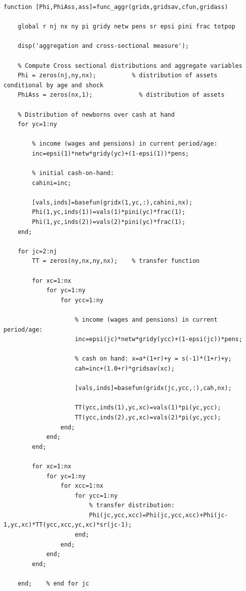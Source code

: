 \documentclass[12pt,a4paper]{article}
\begin{document}
\begin{lstlisting}[frame=single]
    function [Phi,PhiAss,ass]=func_aggr(gridx,gridsav,cfun,gridass)

    global r nj nx ny pi gridy netw pens sr epsi pini frac totpop

    disp('aggregation and cross-sectional measure');

    % Compute Cross sectional distributions and aggregate variables
    Phi = zeros(nj,ny,nx);          % distribution of assets conditional by age and shock
    PhiAss = zeros(nx,1);             % distribution of assets

    % Distribution of newborns over cash at hand
    for yc=1:ny

        % income (wages and pensions) in current period/age:
        inc=epsi(1)*netw*gridy(yc)+(1-epsi(1))*pens;

        % initial cash-on-hand:
        cahini=inc;

        [vals,inds]=basefun(gridx(1,yc,:),cahini,nx);
        Phi(1,yc,inds(1))=vals(1)*pini(yc)*frac(1);
        Phi(1,yc,inds(2))=vals(2)*pini(yc)*frac(1);
    end;

    for jc=2:nj
        TT = zeros(ny,nx,ny,nx);    % transfer function

        for xc=1:nx
            for yc=1:ny
                for ycc=1:ny

                    % income (wages and pensions) in current period/age:
                    inc=epsi(jc)*netw*gridy(ycc)+(1-epsi(jc))*pens;

                    % cash on hand: x=a*(1+r)+y = s(-1)*(1+r)+y;
                    cah=inc+(1.0+r)*gridsav(xc);

                    [vals,inds]=basefun(gridx(jc,ycc,:),cah,nx);

                    TT(ycc,inds(1),yc,xc)=vals(1)*pi(yc,ycc);
                    TT(ycc,inds(2),yc,xc)=vals(2)*pi(yc,ycc);
                end;
            end;
        end;

        for xc=1:nx
            for yc=1:ny
                for xcc=1:nx
                    for ycc=1:ny
                        % transfer distribution:
                        Phi(jc,ycc,xcc)=Phi(jc,ycc,xcc)+Phi(jc-1,yc,xc)*TT(ycc,xcc,yc,xc)*sr(jc-1);
                    end;
                end;
            end;
        end;

    end;    % end for jc
\end{lstlisting}
\end{document}
